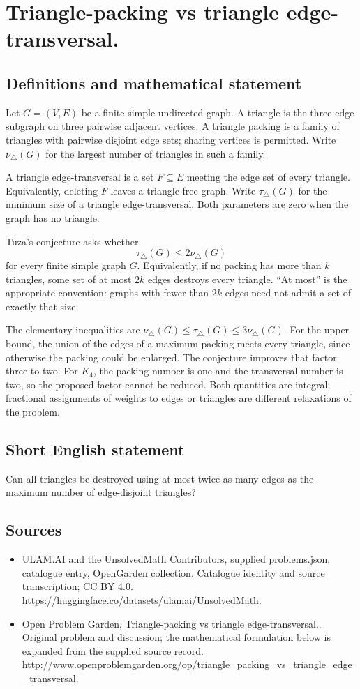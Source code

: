 \documentclass[11pt,a4paper]{article}
\begin{document}
\section*{Triangle-packing vs triangle edge-transversal.}\label{statement}

\subsection{Definitions and mathematical statement}
Let $G=(V,E)$ be a finite simple undirected graph. A triangle is the
three-edge subgraph on three pairwise adjacent vertices. A triangle
packing is a family of triangles with pairwise disjoint edge sets;
sharing vertices is permitted. Write $\nu_{\triangle}(G)$ for the largest
number of triangles in such a family.

A triangle edge-transversal is a set $F\subseteq E$ meeting the edge set
of every triangle. Equivalently, deleting $F$ leaves a triangle-free
graph. Write $\tau_{\triangle}(G)$ for the minimum size of a triangle
edge-transversal. Both parameters are zero when the graph has no
triangle.

Tuza's conjecture asks whether
\[
                    \tau_{\triangle}(G)\le2\nu_{\triangle}(G)
\]
for every finite simple graph $G$. Equivalently, if no packing has more
than $k$ triangles, some set of at most $2k$ edges destroys every
triangle. ``At most'' is the appropriate convention: graphs with fewer
than $2k$ edges need not admit a set of exactly that size.

The elementary inequalities are
$\nu_{\triangle}(G)\le\tau_{\triangle}(G)\le3\nu_{\triangle}(G)$.
For the upper bound, the union of the edges of a maximum packing
meets every triangle, since otherwise the packing could be enlarged.
The conjecture improves that factor three to two. For $K_4$, the
packing number is one and the transversal number is two, so the
proposed factor cannot be reduced. Both quantities are integral;
fractional assignments of weights to edges or triangles are different
relaxations of the problem.
\subsection{Short English statement}
Can all triangles be destroyed using at most twice as many edges as the maximum number of edge-disjoint triangles?
\subsection{Sources}
\begin{itemize}
\item[S1] ULAM.AI and the UnsolvedMath Contributors, supplied problems.json, catalogue entry, OpenGarden collection. Catalogue identity and source transcription; CC BY 4.0.
\url{https://huggingface.co/datasets/ulamai/UnsolvedMath}.
\item[S2] Open Problem Garden, Triangle-packing vs triangle edge-transversal.. Original problem and discussion; the mathematical formulation below is expanded from the supplied source record.
\url{http://www.openproblemgarden.org/op/triangle_packing_vs_triangle_edge_transversal}.
\end{itemize}
\end{document}
